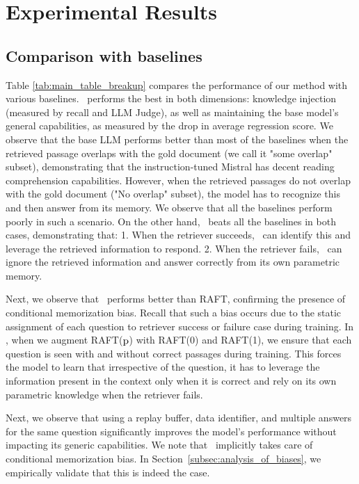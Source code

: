 
\section{Experimental Results}

\subsection{Comparison with baselines}
Table \ref{tab:main_table_breakup} compares the performance of our method with various baselines. 
\ourmethodshort\ performs the best in both dimensions: knowledge injection (measured by recall and LLM Judge), as well as maintaining the base model's general capabilities, as measured by the drop in average regression score. 
We observe that the base LLM performs better than most of the baselines when the retrieved passage overlaps with the gold document (we call it "some overlap" subset), demonstrating that the instruction-tuned Mistral has decent reading comprehension capabilities. 
However, when the retrieved passages do not overlap with the gold document ("No overlap" subset), the model has to recognize this and then answer from its memory.
We observe that all the baselines perform poorly in such a scenario.
On the other hand, \ourmethodshort\ beats all the baselines in both cases, demonstrating that:
1. When the retriever succeeds, \ourmethodshort\ can identify this and leverage the retrieved information to respond.
2. When the retriever fails, \ourmethodshort\ can ignore the retrieved information and answer correctly from its own parametric memory.

Next, we observe that \raftmix\ performs better than RAFT, confirming the presence of conditional memorization bias. Recall that such a bias occurs due to the static assignment of each question to retriever success or failure case during training. In \raftmix, when we augment RAFT($\mathrm{p}$) with RAFT(0) and RAFT(1), we ensure that each question is seen with and without correct passages during training. This forces the model to learn that irrespective of the question, it has to leverage the information present in the context only when it is correct and rely on its own parametric knowledge when the retriever fails. 

Next, we observe that using a replay buffer, data identifier, and multiple answers for the same question significantly improves the model's performance without impacting its generic capabilities.
We note that \ourmethodshort\ implicitly takes care of conditional memorization bias. 
In Section~\ref{subsec:analysis_of_biases}, we empirically validate that this is indeed the case.

